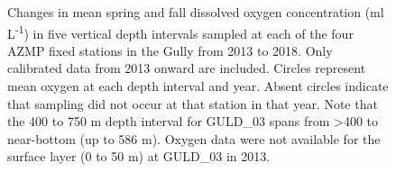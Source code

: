 \documentclass[12pt]{article}\usepackage[]{graphicx}\usepackage[]{color}
\begin{document}
\begin{figure}[htb]

{\centering {} 

}

\caption{Changes in mean spring and fall dissolved oxygen concentration (ml L\textsuperscript{-1}) in five vertical depth intervals sampled at each of the four AZMP fixed stations in the Gully from 2013 to 2018. Only calibrated data from 2013 onward are included. Circles represent mean oxygen at each depth interval and year. Absent circles indicate that sampling did not occur at that station in that year. Note that the 400 to 750 m depth interval for GULD\_03 spans from \textgreater400 to near-bottom (up to 586 m). Oxygen data were not available for the surface layer (0 to 50 m) at GULD\_03 in 2013.}\label{fig:figure12}
\end{figure}
\clearpage
\end{document}
